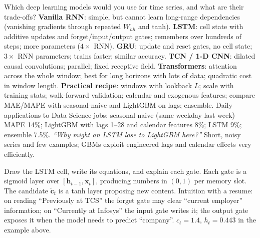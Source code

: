 \begin{qa}{ Which deep learning models would you use for time series, and what are their trade-offs?}
\why
\textbf{Vanilla RNN}: simple, but cannot learn long-range dependencies (vanishing gradients through repeated $W_{hh}$ and tanh).
\textbf{LSTM}: cell state with additive updates and forget/input/output gates; remembers over hundreds of steps; more parameters ($4\times$ RNN).
\textbf{GRU}: update and reset gates, no cell state; $3\times$ RNN parameters; trains faster; similar accuracy.
\textbf{TCN / 1-D CNN}: dilated causal convolutions; parallel; fixed receptive field.
\textbf{Transformers}: attention across the whole window; best for long horizons with lots of data; quadratic cost in window length.
\textbf{Practical recipe}: windows with lookback $L$; scale with training stats; walk-forward validation; calendar and exogenous features; compare MAE/MAPE with seasonal-naive and
LightGBM on lags; ensemble.
\worked Daily applications to Data Science jobs: seasonal naive (same weekday last week) MAPE 14\%; LightGBM with lags 1--28 and calendar features 8\%; LSTM 9\%; ensemble 7.5\%.
\pushes \emph{``Why might an LSTM lose to LightGBM here?''} Short, noisy series and few examples; GBMs exploit engineered lags and calendar effects very efficiently.
\end{qa}

\begin{qa}{ Draw the LSTM cell, write its equations, and explain each gate.}
\why Each gate is a sigmoid layer over $[\mathbf h_{t-1},\mathbf x_t]$, producing numbers in $(0,1)$ per memory slot. The candidate $\tilde{\mathbf c}_t$ is a tanh layer proposing
new content. Intuition with a resume: on reading ``Previously at TCS'' the forget gate may clear ``current employer'' information; on ``Currently at Infosys'' the input gate
writes it; the output gate exposes it when the model needs to predict ``company''.
\worked $c_t = 1.4$, $h_t = 0.443$ in the example above.
\end{qa}


